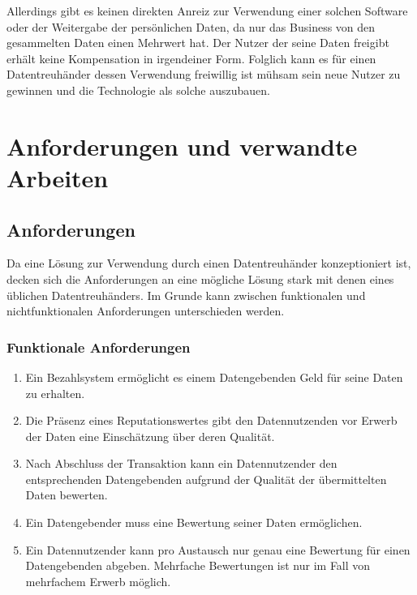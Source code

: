 \documentclass[11pt,a4paper]{scrreprt}
\begin{document}
Allerdings gibt es keinen direkten Anreiz zur Verwendung einer solchen Software oder der Weitergabe der persönlichen Daten, da nur das Business von den gesammelten Daten einen Mehrwert hat. Der Nutzer der seine Daten freigibt erhält keine Kompensation in irgendeiner Form. Folglich kann es für einen Datentreuhänder dessen Verwendung freiwillig ist mühsam sein neue Nutzer zu gewinnen und die Technologie als solche auszubauen.




\chapter{Anforderungen und verwandte Arbeiten}
\section{Anforderungen}
\label{sec:req}
Da eine Lösung zur Verwendung durch einen Datentreuhänder konzeptioniert ist, decken sich die Anforderungen an eine mögliche Lösung stark mit denen eines üblichen Datentreuhänders. Im Grunde kann zwischen funktionalen und nichtfunktionalen Anforderungen unterschieden werden.

\subsection{Funktionale Anforderungen}
\label{enum:req:funktional}
\begin{enumerate}
    \item Ein Bezahlsystem ermöglicht es einem Datengebenden Geld für seine Daten zu erhalten.
    
    \item Die Präsenz eines Reputationswertes gibt den Datennutzenden vor Erwerb der Daten eine Einschätzung über deren Qualität.
    \item Nach Abschluss der Transaktion kann ein Datennutzender den entsprechenden Datengebenden aufgrund der Qualität der übermittelten Daten bewerten.
    \item Ein Datengebender muss eine Bewertung seiner Daten ermöglichen.
    \item Ein Datennutzender kann pro Austausch nur genau eine Bewertung für einen Datengebenden abgeben. Mehrfache Bewertungen ist nur im Fall von mehrfachem Erwerb möglich.
\end{enumerate}
\end{document}
